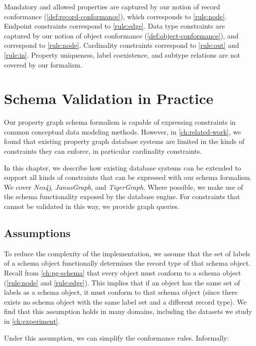 \documentclass{report}
\theoremstyle{definition}
\begin{document}
Mandatory and allowed properties are captured by our notion of record conformance (\autoref{def:record-conformance}), which corresponds to \autoref{rule:node}. Endpoint constraints correspond to \autoref{rule:edge}. Data type constraints are captured by our notion of object conformance (\autoref{def:object-conformance}), and correspond to \autoref{rule:node}. Cardinality constraints correspond to \autoref{rule:out} and \ref{rule:in}. Property uniqueness, label coexistence, and subtype relations are not covered by our formalism.

\chapter{Schema Validation in Practice}
\label{ch:practice}

Our property graph schema formalism is capable of expressing constraints in common conceptual data modeling methods. However, in \autoref{ch:related-work}, we found that existing property graph database systems are limited in the kinds of constraints they can enforce, in particular cardinality constraints.

In this chapter, we describe how existing database systems can be extended to support all kinds of constraints that can be expressed with our schema formalism. We cover \emph{Neo4j}, \emph{JanusGraph}, and \emph{TigerGraph}. Where possible, we make use of the schema functionality exposed by the database engine. For constraints that cannot be validated in this way, we provide graph queries.

\section{Assumptions}

To reduce the complexity of the implementation, we assume that the set of labels of a schema object functionally determines the record type of that schema object. Recall from \autoref{ch:pg-schema} that every object must conform to a schema object (\autoref{rule:node} and \ref{rule:edge}). This implies that if an object has the same set of labels as a schema object, it must conform to that schema object (since there exists no schema object with the same label set and a different record type). We find that this assumption holds in many domains, including the datasets we study in \autoref{ch:experiment}.

Under this assumption, we can simplify the conformance rules. Informally:
\end{document}
